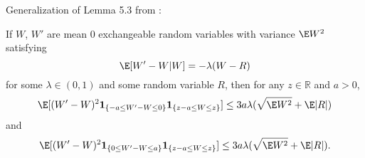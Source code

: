 Generalization of Lemma 5.3 from \cite{chen2010normal}:
\begin{lemma}
  \label{L:stein-difference-second-moment-generalization-bound}
  If $W$, $W'$ are mean 0 exchangeable random variables with variance
  $\E W^2$
  satisfying
  \begin{equation*}
    \E[W'-W|W] = -\lambda(W-R)
  \end{equation*}
  for some $\lambda \in (0,1)$ and some random variable $R$, then for any
  $z \in \mathbb{R}$ and $a > 0$,
  \begin{equation*}
    \E [(W'-W)^2 \mathbf{1}_{\{-a \leq W' - W \leq 0\}} \mathbf{1}_{\{z-a \leq W \leq z\}}] \leq
    3a \lambda (\sqrt{\E W^2} + \E |R|)
  \end{equation*}
  and
  \begin{equation*}
    \E [(W'-W)^2 \mathbf{1}_{\{0 \leq W' - W \leq a\}} \mathbf{1}_{\{z-a \leq W \leq z\}}] \leq
        3a \lambda (\sqrt{\E W^2} + \E |R|).
  \end{equation*}
\end{lemma}
